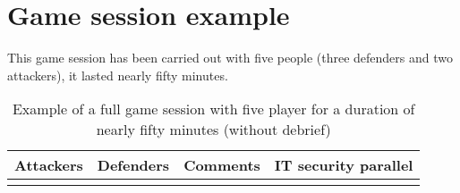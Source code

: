 \documentclass[11pt]{article} %
\begin{document}
\newpage
\section{Game session example}
This game session has been carried out with five people (three defenders and two attackers), 
it lasted nearly fifty minutes.

\begin{longtable}{|p{3cm}|p{3cm}|p{3cm}|p{3cm}|}
    

  \caption[Real case]{Example of a full game session with five player for a duration of 
  nearly fifty minutes (without debrief)}  \\
      
\hline 
Attackers & Defenders & Comments & IT security parallel \\
\hline 
\endhead 
\hline 
\endfoot


\end{longtable}
\end{document}
